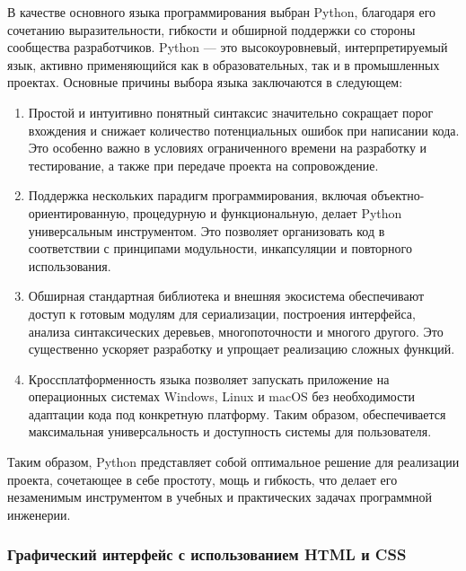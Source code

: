 В качестве основного языка программирования выбран Python, благодаря его сочетанию выразительности, гибкости и обширной поддержки со стороны сообщества разработчиков. Python — это высокоуровневый, интерпретируемый язык, активно применяющийся как в образовательных, так и в промышленных проектах. Основные причины выбора языка заключаются в следующем:
\begin{enumerate}
	\item Простой и интуитивно понятный синтаксис значительно сокращает порог вхождения и снижает количество потенциальных ошибок при написании кода. Это особенно важно в условиях ограниченного времени на разработку и тестирование, а также при передаче проекта на сопровождение.
	\item Поддержка нескольких парадигм программирования, включая объектно-ориентированную, процедурную и функциональную, делает Python универсальным инструментом. Это позволяет организовать код в соответствии с принципами модульности, инкапсуляции и повторного использования.
	\item Обширная стандартная библиотека и внешняя экосистема обеспечивают доступ к готовым модулям для сериализации, построения интерфейса, анализа синтаксических деревьев, многопоточности и многого другого. Это существенно ускоряет разработку и упрощает реализацию сложных функций.
	\item Кроссплатформенность языка позволяет запускать приложение на операционных системах Windows, Linux и macOS без необходимости адаптации кода под конкретную платформу. Таким образом, обеспечивается максимальная универсальность и доступность системы для пользователя.	
\end{enumerate}
Таким образом, Python представляет собой оптимальное решение для реализации проекта, сочетающее в себе простоту, мощь и гибкость, что делает его незаменимым инструментом в учебных и практических задачах программной инженерии.

\subsubsection{Графический интерфейс с использованием HTML и CSS}

